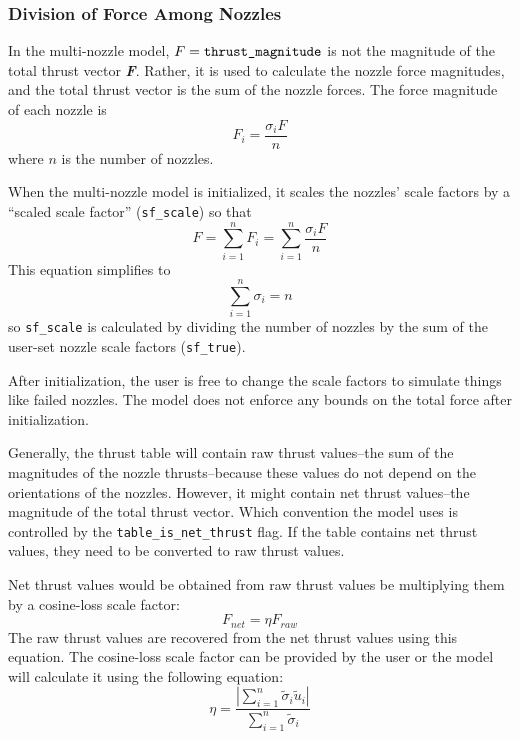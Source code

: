 \documentclass[11pt,fleqn]{report}
\begin{document}
\subsubsection{Division of Force Among Nozzles}
\par In the multi-nozzle model, $F = \verb|thrust_magnitude|$ is not the magnitude of the total thrust vector \textbf{\textit{F}}. Rather, it is used to calculate the nozzle force magnitudes, and the total thrust vector is the sum of the nozzle forces. The force magnitude of each nozzle is
$$F_i = \frac{\sigma_i F}{n}$$
where $n$ is the number of nozzles.
\par When the multi-nozzle model is initialized, it scales the nozzles' scale factors by a ``scaled scale factor'' (\verb|sf_scale|) so that
$$F = \sum\limits_{i=1}^n F_i = \sum\limits_{i=1}^n \frac{\sigma_i F}{n}$$
This equation simplifies to
$$\sum\limits_{i=1}^n \sigma_i = n$$
so \verb|sf_scale| is calculated by dividing the number of nozzles by the sum of the user-set nozzle scale factors (\verb|sf_true|).
\par After initialization, the user is free to change the scale factors to simulate things like failed nozzles. The model does not enforce any bounds on the total force after initialization.
\par Generally, the thrust table will contain raw thrust values--the sum of the magnitudes of the nozzle thrusts--because these values do not depend on the orientations of the nozzles. However, it might contain net thrust values--the magnitude of the total thrust vector. Which convention the model uses is controlled by the \verb|table_is_net_thrust| flag. If the table contains net thrust values, they need to be converted to raw thrust values.
\par Net thrust values would be obtained from raw thrust values be multiplying them by a cosine-loss scale factor:
$$F_{net} = \eta F_{raw}$$
The raw thrust values are recovered from the net thrust values using this equation. The cosine-loss scale factor can be provided by the user or the model will calculate it using the following equation:
$$\eta = \frac{\left|\sum\limits_{i=1}^n\tilde{\sigma}_i \tilde{u}_i \right|}{\sum\limits_{i=1}^n \tilde{\sigma}_i}$$
\end{document}
